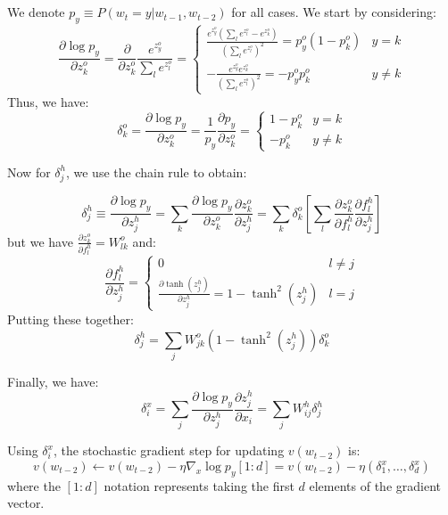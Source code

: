 \documentclass[psamsfonts]{amsart}
\theoremstyle{definition}
\theoremstyle{remark}
\numberwithin{equation}{section}
\begin{document}
\subsection{} We denote $p_y \equiv P(w_t = y|w_{t-1}, w_{t-2})$ for all cases. We start by considering:
$$\frac{\partial \log p_y}{\partial z_{k}^o} = \frac{\partial}{\partial z_k^o} \frac{e^{z_y^o}}{\sum_l e^{z_l^o}} = \left\{ \begin{matrix} \frac{e^{z_y^o}\left( \sum_l e^{z_l^o} - e^{z_k^o} \right)}{\left(\sum_l e^{z_l^o} \right)^2} = p_y^o(1-p_k^o) & y = k \\ -\frac{e^{z_y^o}e^{z_k^o}}{\left(\sum_l e^{z_l^o} \right)^2} = -p_y^o p_k^o & y \neq k \end{matrix} \right.$$
Thus, we have:
$$\delta_k^o = \frac{\partial \log p_y}{\partial z_k^o} = \frac{1}{p_y} \frac{\partial p_y}{\partial z_k^o} = \left\{ \begin{matrix} 1-p_k^o & y = k \\ -p_k^o & y\neq k \end{matrix} \right.$$

Now for $\delta_j^h$, we use the chain rule to obtain:

$$\delta_j^h \equiv \frac{\partial \log p_y}{\partial z_j^h} = \sum_k \frac{\partial \log p_y}{\partial z_k^o} \frac{\partial z_k^o}{\partial z_j^h} = \sum_k \delta_k^o \left[ \sum_l \frac{\partial z_k^o}{\partial f_l^h}\frac{\partial f_l^h}{\partial z_j^h} \right]$$
but we have $\frac{\partial z_k^o}{\partial f_l^h} = W_{lk}^o$ and:
$$\frac{\partial f_l^h}{\partial z_j^h} = \left\{ \begin{matrix} 0 & l \neq j \\ \frac{\partial \tanh(z_j^h)}{\partial z_j^h} = 1-\tanh^2(z_j^h) & l = j \end{matrix} \right.$$
Putting these together:
$$\delta_j^h = \sum_j W_{jk}^o (1-\tanh^2(z_j^h)) \delta_k^o$$

Finally, we have:
$$\delta_i^x = \sum_j \frac{\partial \log p_y}{\partial z_j^h}\frac{\partial z_j^h}{\partial x_i} = \sum_j W_{ij}^h\delta_j^h$$

Using $\delta_i^x$, the stochastic gradient step for updating $v(w_{t-2})$ is:
$$v(w_{t-2}) \leftarrow v(w_{t-2}) - \eta \nabla_{x} \log p_y[1:d] = v(w_{t-2}) - \eta (\delta_1^x, \dots, \delta_d^x)$$
where the $[1:d]$ notation represents taking the first $d$ elements of the gradient vector. 

\subsection{}
\end{document}

